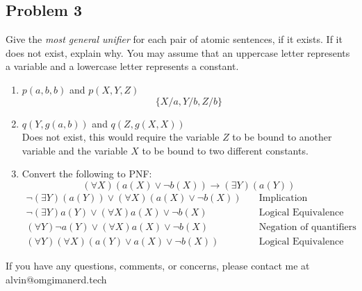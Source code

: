 \documentclass{math}
\begin{document}
\subsection*{Problem 3}
Give the \textit{most general unifier} for each pair of atomic sentences, if it
exists. If it does not exist, explain why. You may assume that an uppercase
letter represents a variable and a lowercase letter represents a constant.
\begin{enumerate}
  \item \( p(a,b,b) \) and \( p(X,Y,Z) \)
  \[ \{X/a, Y/b, Z/b\} \]
  \item \( q(Y,g(a,b)) \) and \( q(Z,g(X,X)) \) \\
  Does not exist, this would require the variable \( Z \) to be bound to another
  variable and the variable \( X \) to be bound to two different constants.
  \item Convert the following to PNF:
  \[ (\forall X)(a(X)\vee\neg b(X))\to(\exists Y)(a(Y)) \]
  \begin{align}
    \neg(\exists Y)(a(Y))\vee(\forall X)(a(X)\vee\neg b(X))
      &\quad \text{Implication Eliminination} \\
    \neg(\exists Y)a(Y)\vee(\forall X)a(X)\vee\neg b(X)
      &\quad \text{Logical Equivalence} \\
    (\forall Y)\neg a(Y)\vee(\forall X)a(X)\vee\neg b(X)
      &\quad \text{Negation of quantifiers} \\
    (\forall Y)(\forall X)(a(Y)\vee a(X)\vee\neg b(X))
      &\quad \text{Logical Equivalence}
  \end{align}
\end{enumerate}

\begin{center}
  If you have any questions, comments, or concerns, please contact me at
  alvin@omgimanerd.tech
\end{center}
\end{document}
